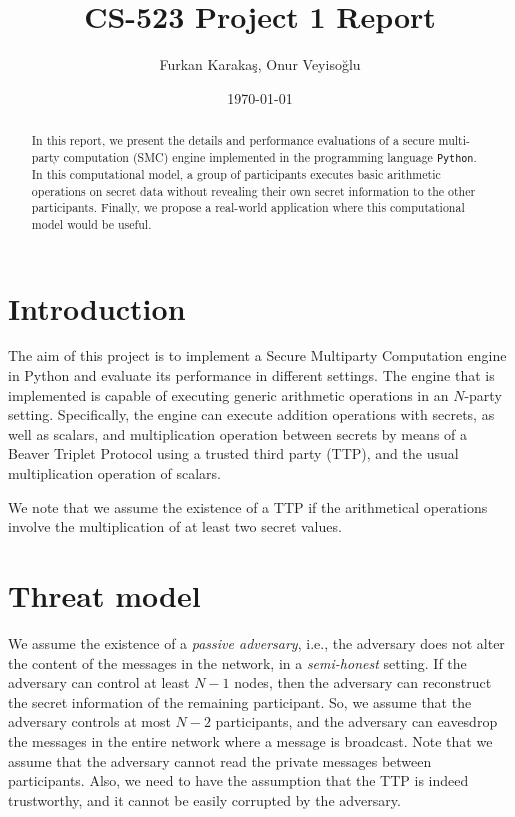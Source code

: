 \documentclass[9pt,conference]{IEEEtran}
\title{CS-523 Project 1 Report}
\author{Furkan Karakaş, Onur Veyisoğlu}
\date{\today}
\begin{document}
\maketitle

\begin{abstract}
In this report, we present the details and performance evaluations of a secure multi-party computation (SMC) engine implemented in the programming language \texttt{Python}. In this computational model, a group of participants executes basic arithmetic operations on secret data without revealing their own secret information to the other participants. Finally, we propose a real-world application where this computational model would be useful.
\end{abstract}

\section{Introduction}
The aim of this project is to implement a Secure Multiparty Computation engine in Python and evaluate its performance in different settings. The engine that is implemented is capable of executing generic arithmetic operations in an $N$-party setting. Specifically, the engine can execute addition operations with secrets, as well as scalars, and multiplication operation between secrets by means of a Beaver Triplet Protocol using a trusted third party (TTP), and the usual multiplication operation of scalars.

We note that we assume the existence of a TTP if the arithmetical operations involve the multiplication of at least two secret values.

\section{Threat model}
We assume the existence of a \textit{passive adversary}, i.e., the adversary does not alter the content of the messages in the network, in a \textit{semi-honest} setting. If the adversary can control at least $N-1$ nodes, then the adversary can reconstruct the secret information of the remaining participant. So, we assume that the adversary controls at most $N-2$ participants, and the adversary can eavesdrop the messages in the entire network where a message is broadcast. Note that we assume that the adversary cannot read the private messages between participants. Also, we need to have the assumption that the TTP is indeed trustworthy, and it cannot be easily corrupted by the adversary.
\end{document}
